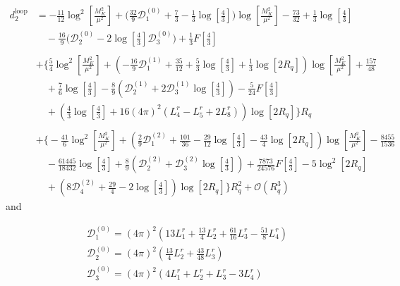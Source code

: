\documentclass[12pt,a4paper]{article}
\begin{document}
\begin{align}
	d_2^{\text{loop}} &= -\frac{11}{12} \log^2 \left[\frac{M_K^2}{\mu^2}\right] + \bigg( \frac{32}{9}\mathcal{D}_1^{(0)} + \frac{7}{3} - \frac{1}{3} \log \left[\frac{4}{3}\right] \bigg) \log \left[ \frac{M_K^2}{\mu^2} \right] -\frac{73}{32} + \frac{1}{3} \log \left[ \frac{4}{3} \right] \nonumber \\
	& \quad - \frac{16}{9} \bigg( \mathcal{D}_2^{(0)} - 2 \log \left[ \frac{4}{3} \right] \mathcal{D}_3^{(0)} \bigg)  + \frac{1}{3} F\left[ \frac{4}{3} \right]  \nonumber \\
	& \nonumber \\
	& + \bigg\{ \frac{5}{4} \log^2 \left[ \frac{M_K^2}{\mu^2}\right] + \left( - \frac{16}{9} \mathcal{D}_1^{(1)} + \frac{35}{12} + \frac{5}{3} \log \left[ \frac{4}{3} \right] + \frac{1}{3} \log\left[ 2R_q \right] \right) \log \left[ \frac{M_K^2}{\mu^2} \right] + \frac{157}{48}
 \nonumber \\ &
\quad + \frac{7}{6} \log \left[ \frac{4}{3} \right] 
	 - \frac{8}{9} \left( \mathcal{D}_2^{(1)} + 2 \mathcal{D}_3^{(1)} \log \left[ \frac{4}{3} \right] \right) - \frac{5}{24} F\left[ \frac{4}{3} \right]
\nonumber\\&\quad
 + \left( \frac{4}{3} \log \left[ \frac{4}{3} \right] + 16 (4 \pi)^2 (L^r_{4}-L^r_{5}+2 L^r_{8}) \right) \log \left[ 2R_q \right] \bigg\} R_q
 \nonumber \\	& \nonumber \\	
	& + \bigg\{ -\frac{41}{6} \log^2 \left[ \frac{M_K^2}{\mu^2} \right] + \left( \frac{2}{9}\mathcal{D}_1^{(2)} + \frac{101}{36} - \frac{29}{12} \log \left[ \frac{4}{3} \right] - \frac{43}{4} \log \left[ 2R_q \right] \right) \log \left[ \frac{M_K^2}{\mu^2} \right] - \frac{8455}{1536} \nonumber \\
	& \quad - \frac{61445}{18432} \log \left[ \frac{4}{3}\right] + \frac{8}{9} \left( \mathcal{D}_2^{(2)} + \mathcal{D}_3^{(2)} \log \left[ \frac{4}{3} \right] \right)+ \frac{7873}{24576} F \left[ \frac{4}{3} \right] - 5 \log^2 \left[ 2 R_q \right] \nonumber \\	
	& \quad + \left( 8 \mathcal{D}_4^{(2)} + \frac{29}{4} - 2 \log \left[ \frac{4}{3} \right] \right) \log \left[ 2 R_q \right]  \bigg\} R_q^2 + \mathcal{O}(R_q^3)
\end{align}
and

\begin{align}
	& \mathcal{D}_1^{(0)} = (4 \pi )^2 \left( 13 L^r_1+\frac{13}{4}L^r_2+\frac{61}{16}L^r_3 -\frac{51}{8} L^r_4 \right) \nonumber \\
	& \mathcal{D}_2^{(0)} = (4 \pi )^2 \left( \frac{13}{4}L^r_2+\frac{43}{48}L^r_3 \right) \nonumber \\
	& \mathcal{D}_3^{(0)} = (4 \pi )^2 \left( 4 L^r_1 + L^r_2 + L^r_3 - 3 L^r_4 \right)
\end{align}
\end{document}

